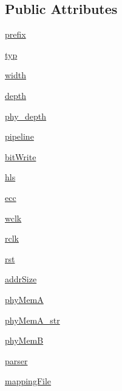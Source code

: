 \subsection*{Public Attributes}
\begin{DoxyCompactItemize}
\item 
\hyperlink{classsrc_1_1memgen_1_1memgen_a2275a75c3ee92da54012efeece30e205}{prefix}
\item 
\hyperlink{classsrc_1_1memgen_1_1memgen_aa5f9640ffa74723720817f5f54ad1f47}{typ}
\item 
\hyperlink{classsrc_1_1memgen_1_1memgen_ab3bc3f87c24cb7b34c653aeb94454b77}{width}
\item 
\hyperlink{classsrc_1_1memgen_1_1memgen_a45876a603d73297c3e114b8f91ba2088}{depth}
\item 
\hyperlink{classsrc_1_1memgen_1_1memgen_ac58a303293dcd561cffc32cd54a85c49}{phy\-\_\-depth}
\item 
\hyperlink{classsrc_1_1memgen_1_1memgen_ae8201442426c5725ad8927394682de8c}{pipeline}
\item 
\hyperlink{classsrc_1_1memgen_1_1memgen_aca429f79fe8e5ac34103cb40fb27663e}{bit\-Write}
\item 
\hyperlink{classsrc_1_1memgen_1_1memgen_a3674d09edf558cb1e1a454359ddf45bf}{hls}
\item 
\hyperlink{classsrc_1_1memgen_1_1memgen_a3f8b4c385ca8eb5df3527a6d1ee4f237}{ecc}
\item 
\hyperlink{classsrc_1_1memgen_1_1memgen_a1c1fc6f4740f81f1e67d7aa977b1ae85}{wclk}
\item 
\hyperlink{classsrc_1_1memgen_1_1memgen_ab98f402bd0d5118c7b3e14a5846b696a}{rclk}
\item 
\hyperlink{classsrc_1_1memgen_1_1memgen_a238129ae0a458bcb4cf4eeee7adae827}{rst}
\item 
\hyperlink{classsrc_1_1memgen_1_1memgen_a2447b0208e27415eda4cd02ee75609da}{addr\-Size}
\item 
\hyperlink{classsrc_1_1memgen_1_1memgen_a816aaff6d49faca11e898fb7324818f7}{phy\-Mem\-A}
\item 
\hyperlink{classsrc_1_1memgen_1_1memgen_a4a3489fc771dcc287ff556db484b9b97}{phy\-Mem\-A\-\_\-str}
\item 
\hyperlink{classsrc_1_1memgen_1_1memgen_ae0ff110997782662388d99c61f30d090}{phy\-Mem\-B}
\item 
\hyperlink{classsrc_1_1memgen_1_1memgen_ab1cd1717a5340d1c3ae5e79211788445}{parser}
\item 
\hyperlink{classsrc_1_1memgen_1_1memgen_ad4b7dd21a4b29870fedd9a2ab2253c11}{mapping\-File}

\end{DoxyCompactItemize}
